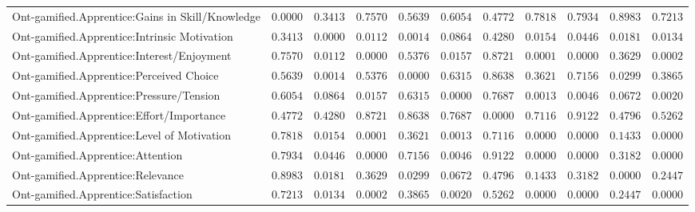 \begin{landscape}
{\begin{longtable}{lrrrrrrrrrr}
Ont-gamified.Apprentice:Gains in Skill/Knowledge&$0.0000$&$0.3413$&$0.7570$&$0.5639$&$0.6054$&$0.4772$&$0.7818$&$0.7934$&$0.8983$&$0.7213$\tabularnewline
Ont-gamified.Apprentice:Intrinsic Motivation&$0.3413$&$0.0000$&$0.0112$&$0.0014$&$0.0864$&$0.4280$&$0.0154$&$0.0446$&$0.0181$&$0.0134$\tabularnewline
Ont-gamified.Apprentice:Interest/Enjoyment&$0.7570$&$0.0112$&$0.0000$&$0.5376$&$0.0157$&$0.8721$&$0.0001$&$0.0000$&$0.3629$&$0.0002$\tabularnewline
Ont-gamified.Apprentice:Perceived Choice&$0.5639$&$0.0014$&$0.5376$&$0.0000$&$0.6315$&$0.8638$&$0.3621$&$0.7156$&$0.0299$&$0.3865$\tabularnewline
Ont-gamified.Apprentice:Pressure/Tension&$0.6054$&$0.0864$&$0.0157$&$0.6315$&$0.0000$&$0.7687$&$0.0013$&$0.0046$&$0.0672$&$0.0020$\tabularnewline
Ont-gamified.Apprentice:Effort/Importance&$0.4772$&$0.4280$&$0.8721$&$0.8638$&$0.7687$&$0.0000$&$0.7116$&$0.9122$&$0.4796$&$0.5262$\tabularnewline
Ont-gamified.Apprentice:Level of Motivation&$0.7818$&$0.0154$&$0.0001$&$0.3621$&$0.0013$&$0.7116$&$0.0000$&$0.0000$&$0.1433$&$0.0000$\tabularnewline
Ont-gamified.Apprentice:Attention&$0.7934$&$0.0446$&$0.0000$&$0.7156$&$0.0046$&$0.9122$&$0.0000$&$0.0000$&$0.3182$&$0.0000$\tabularnewline
Ont-gamified.Apprentice:Relevance&$0.8983$&$0.0181$&$0.3629$&$0.0299$&$0.0672$&$0.4796$&$0.1433$&$0.3182$&$0.0000$&$0.2447$\tabularnewline
Ont-gamified.Apprentice:Satisfaction&$0.7213$&$0.0134$&$0.0002$&$0.3865$&$0.0020$&$0.5262$&$0.0000$&$0.0000$&$0.2447$&$0.0000$\tabularnewline
\hline

\end{longtable}}\end{landscape}


